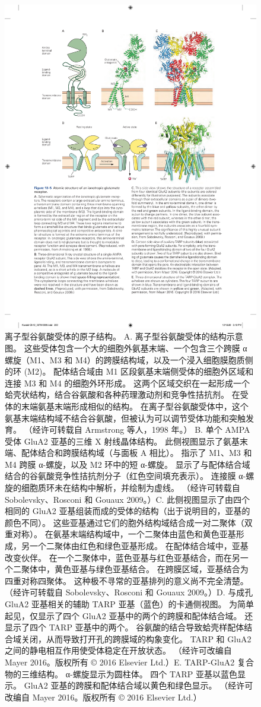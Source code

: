 \begin{figure}[htbp]
	\centering
	\includegraphics[width=0.8\linewidth]{chap13/fig_13_5}
	\caption{离子型谷氨酸受体的原子结构。 A. 离子型谷氨酸受体的结构示意图。 这些受体包含一个大的细胞外氨基末端、一个包含三个跨膜 α 螺旋（M1、M3 和 M4）的跨膜结构域，以及一个浸入细胞膜胞质侧的环 (M2)。 配体结合域由 M1 区段氨基末端侧受体的细胞外区域和连接 M3 和 M4 的细胞外环形成。 这两个区域交织在一起形成一个蛤壳状结构，结合谷氨酸和各种药理激动剂和竞争性拮抗剂。 在受体的末端氨基末端形成相似的结构。 在离子型谷氨酸受体中，这个氨基末端结构域不结合谷氨酸，但被认为可以调节受体功能和突触发育。 （经许可转载自 Armstrong 等人，1998 年。） B. 单个 AMPA 受体 GluA2 亚基的三维 X 射线晶体结构。 此侧视图显示了氨基末端、配体结合和跨膜结构域（与面板 A 相比）。 指示了 M1、M3 和 M4 跨膜 α-螺旋，以及 M2 环中的短 α-螺旋。 显示了与配体结合域结合的谷氨酸竞争性拮抗剂分子（红色空间填充表示）。 连接膜 α-螺旋的细胞质环未在结构中解析，并绘制为虚线。 （经许可转载自 Sobolevsky、Rosconi 和 Gouaux 2009。）C. 此侧视图显示了由四个相同的 GluA2 亚基组装而成的受体的结构（出于说明目的，亚基的颜色不同）。 这些亚基通过它们的胞外结构域结合成一对二聚体（双重对称）。 在氨基末端结构域中，一个二聚体由蓝色和黄色亚基形成，另一个二聚体由红色和绿色亚基形成。 在配体结合域中，亚基改变伙伴。 在一个二聚体中，蓝色亚基与红色亚基结合，而在另一个二聚体中，黄色亚基与绿色亚基结合。 在跨膜区域，亚基结合为四重对称四聚体。 这种极不寻常的亚基排列的意义尚不完全清楚。 （经许可转载自 Sobolevsky、Rosconi 和 Gouaux 2009。）D. 与成孔 GluA2 亚基相关的辅助 TARP 亚基（蓝色）的卡通侧视图。 为简单起见，仅显示了四个 GluA2 亚基中的两个的跨膜和配体结合域。 还显示了四个 TARP 亚基中的两个。 谷氨酸的结合导致蛤壳样配体结合域关闭，从而导致打开孔的跨膜域的构象变化。 TARP 和 GluA2 之间的静电相互作用使受体稳定在开放状态。 （经许可改编自 Mayer 2016。版权所有 © 2016 Elsevier Ltd.）E. TARP-GluA2 复合物的三维结构。 α-螺旋显示为圆柱体。 四个 TARP 亚基以蓝色显示。 GluA2 亚基的跨膜和配体结合域以黄色和绿色显示。 （经许可改编自 Mayer 2016。版权所有 © 2016 Elsevier Ltd.）}
	\label{fig:13_5}
\end{figure}


